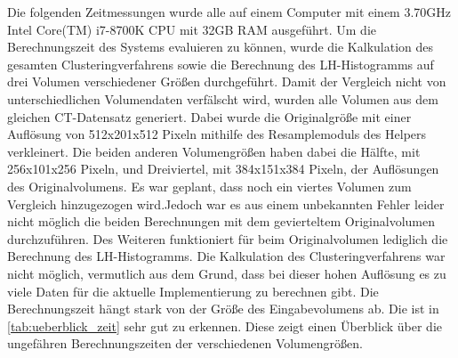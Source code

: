 Die folgenden Zeitmessungen wurde alle auf einem Computer mit einem 3.70GHz  Intel Core(TM) i7-8700K CPU mit 32GB RAM ausgeführt.
\newline
Um die Berechnungszeit des Systems evaluieren zu können, wurde die Kalkulation des gesamten Clusteringverfahrens sowie die Berechnung des LH-Histogramms auf drei Volumen verschiedener Größen durchgeführt. Damit der Vergleich nicht von unterschiedlichen Volumendaten verfälscht wird, wurden alle Volumen aus dem gleichen CT-Datensatz generiert. Dabei wurde die Originalgröße mit einer Auflösung von 512x201x512 Pixeln mithilfe des Resamplemoduls des Helpers verkleinert. Die beiden anderen Volumengrößen haben dabei die  Hälfte, mit 256x101x256 Pixeln, und Dreiviertel, mit 384x151x384 Pixeln, der Auflösungen des Originalvolumens. Es war geplant, dass noch ein viertes Volumen zum Vergleich hinzugezogen wird.Jedoch war es aus einem unbekannten Fehler leider nicht möglich die beiden Berechnungen mit dem gevierteltem Originalvolumen durchzuführen. Des Weiteren funktioniert für beim Originalvolumen lediglich die Berechnung des LH-Histogramms. Die Kalkulation des Clusteringverfahrens war nicht möglich, vermutlich aus dem Grund, dass bei dieser hohen Auflösung es zu viele Daten für die aktuelle Implementierung zu berechnen gibt.
\newline
Die Berechnungszeit hängt stark von der Größe des Eingabevolumens ab. Die ist in \autoref{tab:ueberblick_zeit} sehr gut zu erkennen. Diese zeigt einen Überblick über die ungefähren Berechnungszeiten der verschiedenen Volumengrößen.


\begin{table}[h]
\centering
{}
\caption{Überblick über die Berechnungszeiten der verschiedenen Volumengrößen}
\label{tab:ueberblick_zeit}
\end{table}


